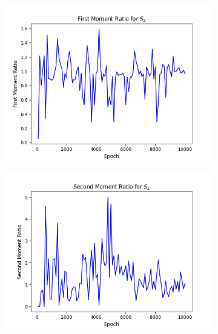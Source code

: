 \documentclass[11pt]{article} %
\begin{document}
\begin{figure}[H]
\begin{minipage}{\textwidth}
  \begin{subfigure}{.5\textwidth}
      \includegraphics[scale=0.6]{./images/moment_1_s2.png}
  \end{subfigure}
  \begin{subfigure}{.5\textwidth}
      \includegraphics[scale=0.6]{./images/moment_2_s2.png}
  \end{subfigure}
\end{minipage}
\begin{minipage}{\textwidth}
  \begin{subfigure}{.5\textwidth}

\end{subfigure}
\end{minipage}
\end{figure}
\end{document}
